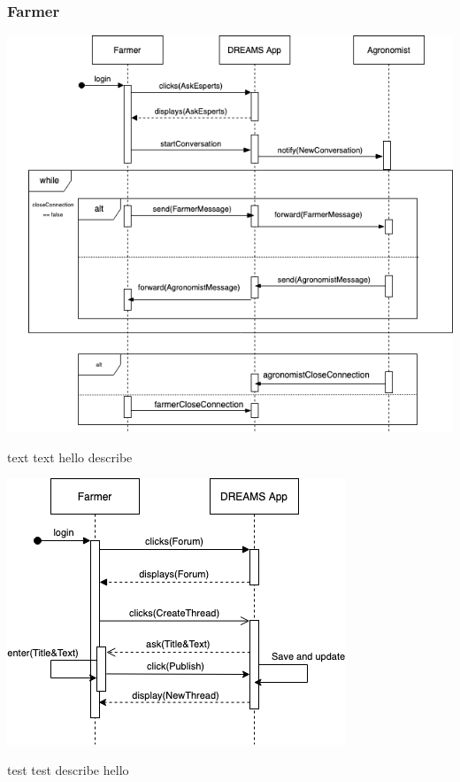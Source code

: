 \subsubsection{Farmer}
\begin{center}
\includegraphics[scale=0.6]{Files/sequence_disgrams/thePNGs/farmer_askExperts.png}\\
\end{center}
text text hello describe
\begin{center}
\includegraphics[scale=0.6]{Files/sequence_disgrams/thePNGs/farmer_createThread.png}\\
\end{center}
test test describe hello
